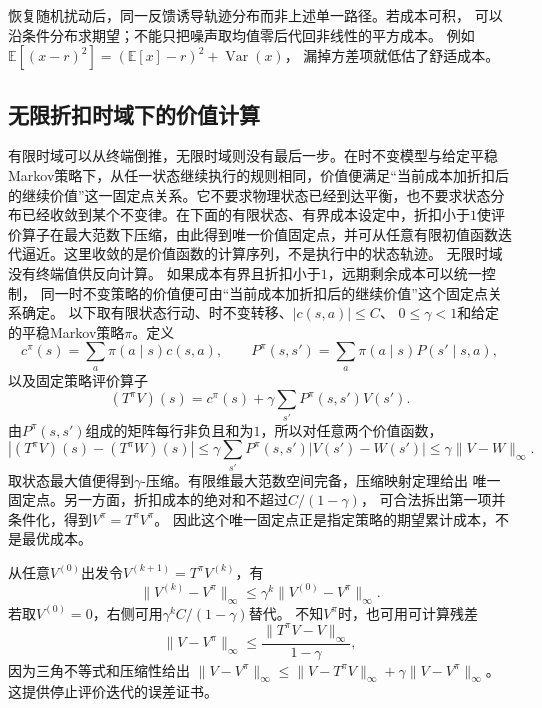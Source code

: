 恢复随机扰动后，同一反馈诱导轨迹分布而非上述单一路径。若成本可积，
可以沿条件分布求期望；不能只把噪声取均值零后代回非线性的平方成本。
例如$\mathbb E[(x-r)^2]=(\mathbb E[x]-r)^2+\operatorname{Var}(x)$，
漏掉方差项就低估了舒适成本。

\subsection{无限折扣时域下的价值计算}
\label{sec:policy-discounted-evaluation}

有限时域可以从终端倒推，无限时域则没有最后一步。在时不变模型与给定平稳Markov策略下，从任一状态继续执行的规则相同，价值便满足“当前成本加折扣后的继续价值”这一固定点关系。它不要求物理状态已经到达平衡，也不要求状态分布已经收敛到某个不变律。在下面的有限状态、有界成本设定中，折扣小于\(1\)使评价算子在最大范数下压缩，由此得到唯一价值固定点，并可从任意有限初值函数迭代逼近。这里收敛的是价值函数的计算序列，不是执行中的状态轨迹。
无限时域没有终端值供反向计算。
如果成本有界且折扣小于$1$，远期剩余成本可以统一控制，
同一时不变策略的价值便可由“当前成本加折扣后的继续价值”这个固定点关系确定。
以下取有限状态行动、时不变转移、$|c(s,a)|\leq C$、
$0\leq\gamma<1$和给定的平稳Markov策略$\pi$。定义
\[
  c^\pi(s)=\sum_a\pi(a\mid s)c(s,a),\qquad
  P^\pi(s,s')=\sum_a\pi(a\mid s)P(s'\mid s,a),
\]
以及固定策略评价算子
\begin{equation}
  (T^\pi V)(s)=c^\pi(s)+\gamma\sum_{s'}P^\pi(s,s')V(s').
  \label{eq:policy-discounted-evaluation-operator}
\end{equation}
由$P^\pi(s,s')$组成的矩阵每行非负且和为$1$，所以对任意两个价值函数，
\[
  |(T^\pi V)(s)-(T^\pi W)(s)|
  \leq\gamma\sum_{s'}P^\pi(s,s')|V(s')-W(s')|
  \leq\gamma\lVert V-W\rVert_\infty.
\]
取状态最大值便得到$\gamma$-压缩。有限维最大范数空间完备，压缩映射定理给出
唯一固定点。另一方面，折扣成本的绝对和不超过$C/(1-\gamma)$，
可合法拆出第一项并条件化，得到$V^\pi=T^\pi V^\pi$。
因此这个唯一固定点正是指定策略的期望累计成本，不是最优成本。

从任意$V^{(0)}$出发令$V^{(k+1)}=T^\pi V^{(k)}$，有
\begin{equation}
  \lVert V^{(k)}-V^\pi\rVert_\infty
  \leq\gamma^k\lVert V^{(0)}-V^\pi\rVert_\infty.
  \label{eq:policy-evaluation-iteration-error}
\end{equation}
若取$V^{(0)}=0$，右侧可用$\gamma^kC/(1-\gamma)$替代。
不知$V^\pi$时，也可用可计算残差
\[
  \lVert V-V^\pi\rVert_\infty
  \leq\frac{\lVert T^\pi V-V\rVert_\infty}{1-\gamma},
\]
因为三角不等式和压缩性给出
$\lVert V-V^\pi\rVert_\infty\leq
\lVert V-T^\pi V\rVert_\infty+\gamma\lVert V-V^\pi\rVert_\infty$。
这提供停止评价迭代的误差证书。

